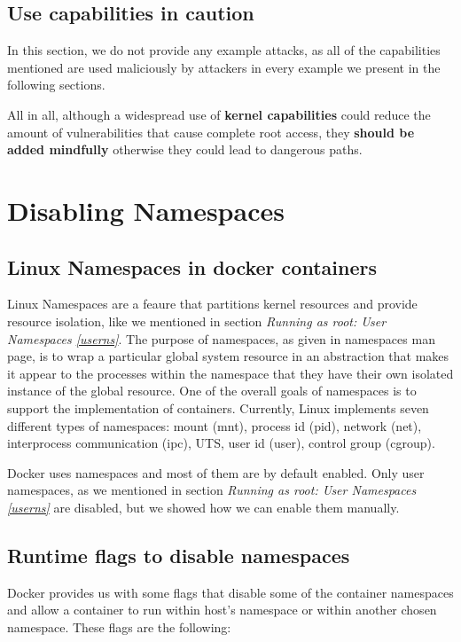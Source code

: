 \subsection{Use capabilities in caution}
In this section, we do not provide any example attacks, as all of the capabilities mentioned are used maliciously by attackers in every example we present in the following sections.

All in all, although a widespread use of \textbf{kernel capabilities} could reduce the amount of vulnerabilities that cause complete root access, they \textbf{should be added mindfully} otherwise they could lead to dangerous paths. 

\section{Disabling Namespaces} \label{disns}
\subsection{Linux Namespaces in docker containers}
Linux Namespaces are a feaure that partitions kernel resources and provide resource isolation, like we mentioned in section \textit{Running as root: User Namespaces \ref{userns}}.  The purpose of namespaces, as given in namespaces man page, is to wrap a particular global system resource in an abstraction that makes it appear to the processes within the namespace that they have their own isolated instance of the global resource. One of the overall goals of namespaces is to support the implementation of containers. 
Currently, Linux implements seven different types of namespaces: mount (mnt), process id (pid), network (net), interprocess communication (ipc), UTS, user id (user), control group (cgroup).

Docker uses namespaces and most of them are by default enabled. Only user namespaces, as we mentioned in section \textit{Running as root: User Namespaces \ref{userns}} are disabled, but we showed how we can enable them manually.

\subsection{Runtime flags to disable namespaces}
Docker provides us with some flags that disable some of the container namespaces and allow a container to run within host's namespace or within another chosen namespace. These flags are the following:

